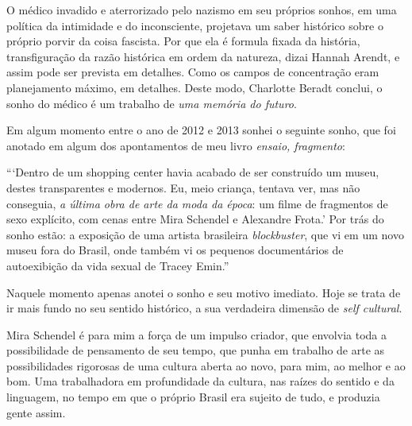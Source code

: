 O médico invadido e aterrorizado pelo nazismo em seu próprios sonhos, em
uma política da intimidade e do inconsciente, projetava um saber
histórico sobre o próprio porvir da coisa fascista. Por que ela é
formula fixada da história, transfiguração da razão histórica em ordem
da natureza, dizai Hannah Arendt, e assim pode ser prevista em detalhes.
Como os campos de concentração eram planejamento máximo, em detalhes.
Deste modo, Charlotte Beradt conclui, o sonho do médico é um trabalho de
\emph{uma memória do futuro}.

Em algum momento entre o ano de 2012 e 2013 sonhei o seguinte sonho, que
foi anotado em algum dos apontamentos de meu livro \emph{ensaio,
fragmento}:

```Dentro de um shopping center havia acabado de ser construído um
museu, destes transparentes e modernos. Eu, meio criança, tentava ver,
mas não conseguia, \emph{a última obra de arte da moda da época}: um
filme de fragmentos de sexo explícito, com cenas entre Mira Schendel e
Alexandre Frota.' Por trás do sonho estão: a exposição de uma artista
brasileira \emph{blockbuster}, que vi em um novo museu fora do Brasil,
onde também vi os pequenos documentários de autoexibição da vida sexual
de Tracey Emin.''

Naquele momento apenas anotei o sonho e seu motivo imediato. Hoje se
trata de ir mais fundo no seu sentido histórico, a sua verdadeira
dimensão de \emph{self cultural}.

Mira Schendel é para mim a força de um impulso criador, que envolvia
toda a possibilidade de pensamento de seu tempo, que punha em trabalho
de arte as possibilidades rigorosas de uma cultura aberta ao novo, para
mim, ao melhor e ao bom. Uma trabalhadora em profundidade da cultura,
nas raízes do sentido e da linguagem, no tempo em que o próprio Brasil
era sujeito de tudo, e produzia gente assim.

